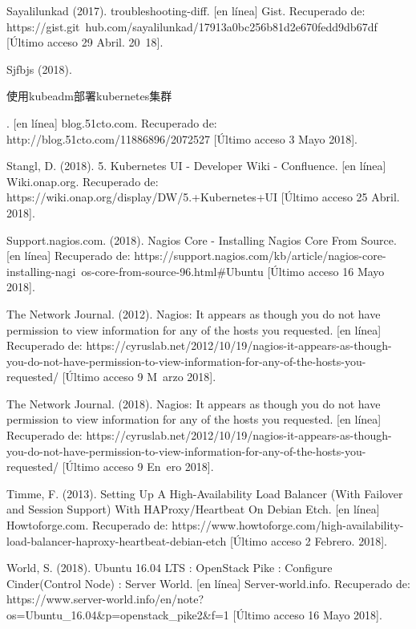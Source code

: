 Sayalilunkad (2017). troubleshooting-diff. [en línea] Gist. Recuperado de: https://gist.git\ hub.com/sayalilunkad/17913a0bc256b81d2e670fedd9db67df [Último acceso 29 Abril. 20\ 18].

Sjfbjs (2018). \begin{CJK*}{UTF8}{gbsn}使用kubeadm部署kubernetes集群\end{CJK*}. [en línea] blog.51cto.com. Recuperado de: http://blog.51cto.com/11886896/2072527 [Último acceso 3 Mayo 2018].

Stangl, D. (2018). 5. Kubernetes UI - Developer Wiki - Confluence. [en línea] Wiki.onap.org. Recuperado de: https://wiki.onap.org/display/DW/5.+Kubernetes+UI [Último acceso 25 Abril. 2018].


Support.nagios.com. (2018). Nagios Core - Installing Nagios Core From Source. [en línea] Recuperado de: https://support.nagios.com/kb/article/nagios-core-installing-nagi\ os-core-from-source-96.html\#Ubuntu [Último acceso 16 Mayo 2018].

The Network Journal. (2012). Nagios: It appears as though you do not have permission to view information for any of the hosts you requested. [en línea] Recuperado de: https://cyruslab.net/2012/10/19/nagios-it-appears-as-though-you-do-not-have-permission-to-view-information-for-any-of-the-hosts-you-requested/ [Último acceso 9 M\ arzo 2018].

The Network Journal. (2018). Nagios: It appears as though you do not have permission to view information for any of the hosts you requested. [en línea] Recuperado de: https://cyruslab.net/2012/10/19/nagios-it-appears-as-though-you-do-not-have-permission-to-view-information-for-any-of-the-hosts-you-requested/ [Último acceso 9 En\ ero 2018].

Timme, F. (2013). Setting Up A High-Availability Load Balancer (With Failover and Session Support) With HAProxy/Heartbeat On Debian Etch. [en línea] Howtoforge.com. Recuperado de: https://www.howtoforge.com/high-availability-load-balancer-haproxy-heartbeat-debian-etch [Último acceso 2 Febrero. 2018].

World, S. (2018). Ubuntu 16.04 LTS : OpenStack Pike : Configure Cinder(Control Node) : Server World. [en línea] Server-world.info. Recuperado de: https://www.server-world.info/en/note?os=Ubuntu\_16.04\&p=openstack\_pike2\&f=1 [Último acceso 16 Mayo 2018].











    
    

